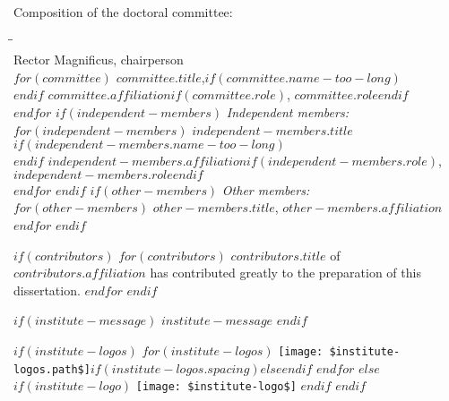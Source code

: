 \begin{titlepage}
    \bigskip
    \noindent Composition of the doctoral committee:
    \begin{tabbing}
        \hspace{\tabcolsep}\=\hspace{0.33\textwidth}\=\hspace{0.66\textwidth}                   \\[-3\medskipamount]
        \> Rector Magnificus,          \> chairperson\\
$for(committee)$
        \> $committee.title$,$if(committee.name-too-long)$\\
        \>$endif$       \>    \> $committee.affiliation$$if(committee.role)$, \textit{$committee.role$}$endif$    \\
$endfor$
$if(independent-members)$
        \>\textit{Independent members:}                                                        \\[\smallskipamount]
$for(independent-members)$
        \>$independent-members.title$$if(independent-members.name-too-long)$\\
        \>$endif$       \> $independent-members.affiliation$$if(independent-members.role)$, $independent-members.role$$endif$                         \\
$endfor$
$endif$
$if(other-members)$
        \>\textit{Other members:}                                                               \\[\smallskipamount]
$for(other-members)$
        \>$other-members.title$, \> $other-members.affiliation$                         \\
$endfor$
$endif$
    \end{tabbing}

$if(contributors)$
    \medskip
$for(contributors)$
    \noindent $contributors.title$ of $contributors.affiliation$ has contributed greatly to the preparation of this dissertation.
$endfor$
$endif$

$if(institute-message)$
    \medskip
    \noindent $institute-message$
$endif$

    \vfill
        \begin{center}
        $if(institute-logos)$
        $for(institute-logos)$
                \texttt{[image: \$institute-logos.path\$]}$if(institute-logos.spacing)$\hspace{$institute-logos.spacing$}$else$\hspace{1cm}$endif$
        $endfor$
        $else$
        $if(institute-logo)$
                \texttt{[image: \$institute-logo\$]}
        $endif$
        $endif$
        \end{center}
    \vfill


\end{titlepage}
